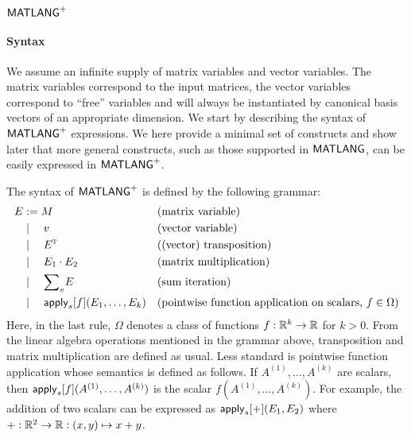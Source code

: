 \newpage 
\section{$\mathsf{MATLANG}^{\sf +}$}

\paragraph{Syntax}
We assume an infinite supply of matrix variables and vector variables. The matrix variables  correspond to the input matrices, the vector variables
correspond to ``free'' variables and will always be instantiated by canonical basis vectors of an appropriate dimension.
%
%
%
%
%
We start by describing  the syntax of  $\mathsf{MATLANG}^{\sf +}$ expressions. We here provide a minimal set of constructs and show later that more general constructs, such as those supported
in $\mathsf{MATLANG}$, can be easily expressed in $\mathsf{MATLANG}^{\sf +}$.  

The syntax of $\mathsf{MATLANG}^{\sf +}$ is defined by the following grammar:
\begin{align*}
	E&:=M && \text{(matrix variable)} \\
       &\mid\quad v &&\text{(vector variable)}\\
        &\mid\quad E^{\textsc{t}} &&\text{((vector) transposition)}\\
    &\mid\quad E_1 \cdot E_2 && \text{(matrix multiplication)} \\
	  &\mid\quad{\sum}_{v} E &&\text{(sum iteration)} \\
	      &\mid\quad \mathsf{apply}_s[f](E_1, \ldots, E_k) && \text{(pointwise function
    application on scalars, $f \in \Omega$)}
\end{align*}
Here, in the last rule, $\Omega$ denotes a class of functions $f:\mathbb{R}^k\to \mathbb{R}$ for $k>0$.  From the linear algebra operations mentioned in the grammar above, transposition and matrix multiplication are defined as usual. Less standard is  pointwise function application whose semantics is defined as follows. If $A^{(1)},\dots,A^{(k)}$ are scalars, then 
$\mathsf{apply}_s[f](A^{(1)},\dots,A^{(k)})$ is the scalar $f(A^{(1)},\dots,A^{(k)})$.  For example, the addition of two scalars can be expressed as $\mathsf{apply}_s[+](E_1,E_2)$ where $+:\mathbb{R}^2\to \mathbb{R}:(x,y)\mapsto x+y$.

